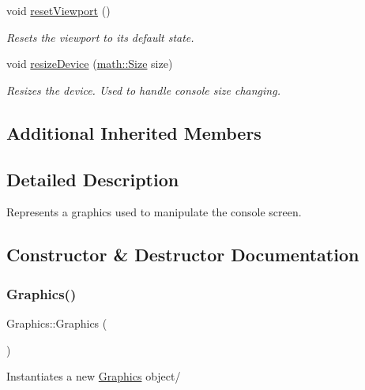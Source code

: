 \begin{DoxyCompactItemize}
void \mbox{\hyperlink{class_graphics_a9ea1070d0c5aecd499f40a7f1d9dabcc}{reset\+Viewport}} ()
\begin{DoxyCompactList}\small\item\em Resets the viewport to its default state. \end{DoxyCompactList}\item 
void \mbox{\hyperlink{class_graphics_a90e45bd4d727b151cb7adf43d1c8a5f6}{resize\+Device}} (\mbox{\hyperlink{structmath_1_1_size}{math\+::\+Size}} size)
\begin{DoxyCompactList}\small\item\em Resizes the device. Used to handle console size changing. \end{DoxyCompactList}\end{DoxyCompactItemize}
\subsection*{Additional Inherited Members}


\subsection{Detailed Description}
Represents a graphics used to manipulate the console screen. 



\subsection{Constructor \& Destructor Documentation}
\mbox{\label{class_graphics_af2e8fe67fd31ec263c843a6e28b29d3c}} 
\subsubsection{\texorpdfstring{Graphics()}{Graphics()}}
{\footnotesize\ttfamily Graphics\+::\+Graphics (\begin{DoxyParamCaption}{ }\end{DoxyParamCaption})}



Instantiates a new \mbox{\hyperlink{class_graphics}{Graphics}} object/ 

\mbox{\label{class_graphics_acfd935938e3e757e2952af5fec13115a}} 
